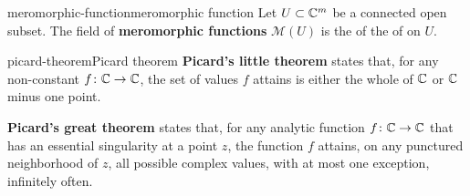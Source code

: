 \begin{topic}{meromorphic-function}{meromorphic function}
    Let $U \subset \mathbb{C}^m$ be a connected open subset. The field of \textbf{meromorphic functions} $\mathcal{M}(U)$ is the  of the  of  on $U$.
\end{topic}

\begin{topic}{picard-theorem}{Picard theorem}
    \textbf{Picard's little theorem} states that, for any non-constant  $f \colon \mathbb{C} \to \mathbb{C}$, the set of values $f$ attains is either the whole of $\mathbb{C}$ or $\mathbb{C}$ minus one point.

    \textbf{Picard's great theorem} states that, for any analytic function $f \colon \mathbb{C} \to \mathbb{C}$ that has an essential singularity at a point $z$, the function $f$ attains, on any punctured neighborhood of $z$, all possible complex values, with at most one exception, infinitely often.
\end{topic}
